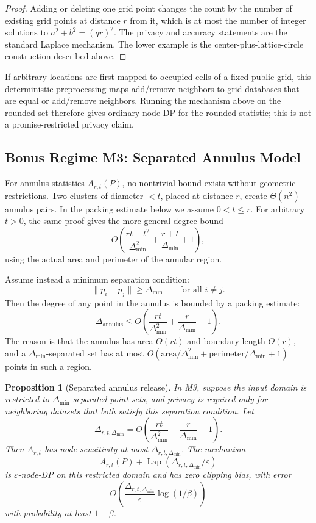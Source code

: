 \documentclass[11pt]{article}
\newtheorem{proposition}[theorem]{Proposition}
\DeclareMathOperator{\Lap}{Lap}
\newcommand{\eps}{\varepsilon}
\begin{document}
\begin{proof}
Adding or deleting one grid point changes the count by the number of existing grid points at distance \(r\) from it, which is at most the number of integer solutions to \(a^2+b^2=(qr)^2\). The privacy and accuracy statements are the standard Laplace mechanism. The lower example is the center-plus-lattice-circle construction described above.
\end{proof}

If arbitrary locations are first mapped to occupied cells of a fixed public grid, this deterministic preprocessing maps add/remove neighbors to grid databases that are equal or add/remove neighbors. Running the mechanism above on the rounded set therefore gives ordinary node-DP for the rounded statistic; this is not a promise-restricted privacy claim.

\subsection{Bonus Regime M3: Separated Annulus Model}

For annulus statistics \(A_{r,t}(P)\), no nontrivial bound exists without geometric restrictions. Two clusters of diameter \(<t\), placed at distance \(r\), create \(\Theta(n^2)\) annulus pairs. In the packing estimate below we assume \(0<t\le r\). For arbitrary \(t>0\), the same proof gives the more general degree bound
\[
O\!\left(
\frac{rt+t^2}{\Delta_{\min}^2}
+\frac{r+t}{\Delta_{\min}}+1
\right),
\]
using the actual area and perimeter of the annular region.

Assume instead a minimum separation condition:
\[
\|p_i-p_j\|\ge \Delta_{\min}\qquad\text{for all }i\ne j.
\]
Then the degree of any point in the annulus is bounded by a packing estimate:
\[
\Delta_{\text{annulus}}\le O\!\left(\frac{rt}{\Delta_{\min}^2}+\frac{r}{\Delta_{\min}}+1\right).
\]
The reason is that the annulus has area \(\Theta(rt)\) and boundary length \(\Theta(r)\), and a \(\Delta_{\min}\)-separated set has at most \(O(\mathrm{area}/\Delta_{\min}^2+\mathrm{perimeter}/\Delta_{\min}+1)\) points in such a region.

\begin{proposition}[Separated annulus release]
\label{prop:m3}
In M3, suppose the input domain is restricted to \(\Delta_{\min}\)-separated point sets, and privacy is required only for neighboring datasets that both satisfy this separation condition. Let
\[
\Delta_{r,t,\Delta_{\min}}=
O\!\left(\frac{rt}{\Delta_{\min}^2}+\frac{r}{\Delta_{\min}}+1\right).
\]
Then \(A_{r,t}\) has node sensitivity at most \(\Delta_{r,t,\Delta_{\min}}\). The mechanism
\[
A_{r,t}(P)+\Lap(\Delta_{r,t,\Delta_{\min}}/\eps)
\]
is \(\eps\)-node-DP on this restricted domain and has zero clipping bias, with error
\[
O\!\left(\frac{\Delta_{r,t,\Delta_{\min}}}{\eps}\log(1/\beta)\right)
\]
with probability at least \(1-\beta\).
\end{proposition}
\end{document}
